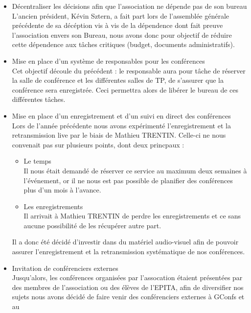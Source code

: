 \documentclass[12pt]{report}
\begin{document}
  \begin{itemize}
    \item
      Décentraliser les décisions afin que l'association ne dépende pas de son
      bureau\\ L'ancien président, Kévin Sztern, a fait part lors de l'assemblée
      générale précédente de sa décéption vis à vis de la dépendence dont fait
      preuve l'association envers son Bureau, nous avons donc pour objectif de
      réduire cette dépendence aux tâches critiques (budget, documents
      administratifs).
    \item
      Mise en place d'un système de responsables pour les conférences\\ Cet
      objectif découle du précédent : le responsable aura pour tâche de réserver
      la salle de conférence et les différentes salles de TP, de s'assurer que
      la conférence sera enregistrée.  Ceci permettra alors de libérer le bureau
      de ces différentes tâches.
    \item
      Mise en place d'un enregistrement et d'un suivi en direct des
      conférences\\ Lors de l'année précédente nous avons expérimenté
      l'enregistrement et la retransmission live par le biais de Mathieu
      TRENTIN. Celle-ci ne nous convenait pas sur plusieurs points, dont deux
      princpaux :
      \begin{itemize}
        \item
          Le temps \\ Il nous était demandé de réserver ce service au maximum
          deux semaines à l'événement, or il ne nous est pas possible de
          planifier des conférences plus d'un mois à l'avance.
        \item
          Les enregistrements \\ Il arrivait à Mathieu TRENTIN de perdre les
          enregistrements et ce sans aucune possibilité de les récupérer autre
          part.
      \end{itemize}
      Il a donc été décidé d'investir dans du matériel audio-visuel afin de
      pouvoir assurer l'enregistrement et la retransmission systématique de nos
      conférences.
    \item
      Invitation de conférenciers externes\\ Jusqu'alors, les conférences
      organisées par l'assocation étaient présentées par des membres de
      l'association ou des élèves de l'EPITA, afin de diversifier nos sujets
      nous avons décidé de faire venir des conférenciers externes à GConfs et au

\end{itemize}
\end{document}
